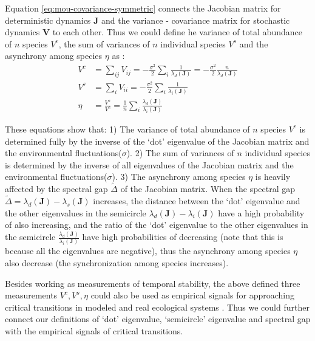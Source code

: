 \documentclass[a4paper,fleqn,12pt]{article}
\begin{document}
Equation \ref{eq:mou-covariance-symmetric} connects the Jacobian matrix for deterministic dynamics $\mathbf{J}$ and the variance - covariance matrix for stochastic dynamics $\mathbf{V}$ to each other.
Thus we could define he variance of total abundance of $n$ species $V^c$, the sum of variances of $n$ individual species $V^s$ and the asynchrony among species $\eta$ as :
\begin{align} \label{eq:nonstructural-deterministic-stochastic}
V^c &= \sum_{ij}V_{ij} = -  \frac{\sigma^2}{2} \sum_{i} \frac{1}{\lambda_d(\mathbf{J})} = -  \frac{\sigma^2}{2} \frac{n}{\lambda_d(\mathbf{J})} \nonumber\\
V^s &= \sum_{i}V_{ii} = -  \frac{\sigma^2}{2} \sum_{i} \frac{1}{\lambda_i(\mathbf{J})} \nonumber\\
\eta &= \frac{V^s}{V^c} = \frac{1}{n} \sum_{i} \frac{\lambda_d(\mathbf{J})}{\lambda_i(\mathbf{J})} 
\end{align}

These equations show that:
1) The variance of total abundance of $n$ species $V^c$ is determined fully by the inverse of the `dot' eigenvalue of the Jacobian matrix and the environmental fluctuations($\sigma$).
2) The sum of variances of $n$ individual species is determined by the inverse of all eigenvalues of the Jacobian matrix and the environmental fluctuations($\sigma$).
3) The asynchrony among species $\eta$ is heavily affected by the spectral gap $\widetilde{\Delta}$ of the Jacobian matrix.
When the spectral gap $\widetilde{\Delta} = \lambda_d(\mathbf{J}) - \lambda_s(\mathbf{J})$ increases,
the distance between the `dot' eigenvalue and the other eigenvalues in the semicircle $\lambda_d(\mathbf{J}) - \lambda_i(\mathbf{J})$ have a high probability of also increasing,
and the ratio of the `dot' eigenvalue to the other eigenvalues in the semicircle $\frac{\lambda_d(\mathbf{J})}{\lambda_i(\mathbf{J})}$ have high probabilities of decreasing (note that this is because all the eigenvalues are negative),
thus the asynchrony among species $\eta$ also decrease (the synchronization among species increases).

Besides working as measurements of temporal stability,
the above defined three measurements $V^c, V^s, \eta$ could also be used as empirical signals for approaching critical transitions in modeled and real ecological systems \cite{scheffer_early-warning_2009,dakos_methods_2012,carpenter_early_2011,dakos_critical_2014}.
Thus we could further connect our definitions of `dot' eigenvalue, `semicircle' eigenvalue and spectral gap with the empirical signals of critical transitions.
\end{document}
